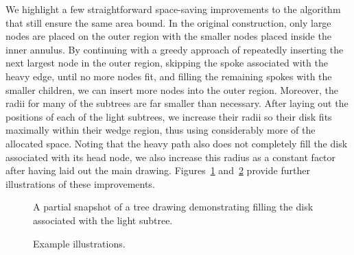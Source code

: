 \documentclass[11pt]{article}
\begin{document}
We highlight a few straightforward space-saving improvements to the algorithm that still ensure the same area bound.
In the original construction, only large nodes are placed on the outer region with the smaller nodes placed inside the inner annulus.  
By continuing with a greedy approach of repeatedly inserting the next largest node in the outer region, skipping the spoke associated with the heavy edge, until no more nodes fit, and filling the remaining spokes with the smaller children, we can insert more nodes into the outer region.  
Moreover, the radii for many of the subtrees are far smaller than necessary.
After laying out the positions of each of the light subtrees, 
we increase their radii so their disk fits maximally within 
their wedge region, thus using considerably more of
the allocated space.
Noting that the heavy path also does not completely fill the disk 
associated with its head node, we also increase this radius as a 
constant factor after having laid out the main drawing.
Figures~\ref{fig:fillOuter} and~\ref{fig:exampleIllustrations}
provide further illustrations of these improvements.

  \begin{figure}[htb]
    \centering
    \hfill
    \caption{A partial snapshot of a tree drawing demonstrating filling the disk associated
with the light subtree.}
    \label{fig:fillOuter}
  \end{figure}



  \begin{figure}[htb]
    \centering
    \hfill
    \caption{Example illustrations.}
    \label{fig:exampleIllustrations}
  \end{figure}
\end{document}
